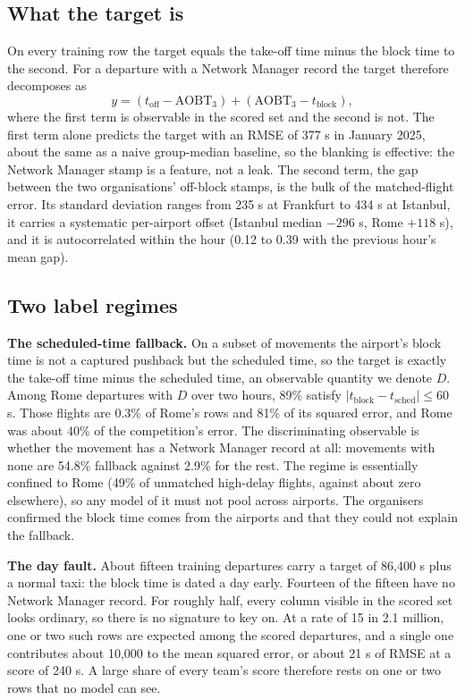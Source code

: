 \documentclass[
  manuscript=article,
  layout=preprint,
  year=2027,
  volume=x,
]{extra/joas}
\begin{document}
\subsection{What the target is}

On every training row the target equals the take-off time minus the block time to the second. For a departure with a Network Manager record the target therefore decomposes as
\begin{equation} \label{eq:decomp}
y = (t_{\mathrm{off}} - \mathrm{AOBT}_3) + (\mathrm{AOBT}_3 - t_{\mathrm{block}}),
\end{equation}
where the first term is observable in the scored set and the second is not. The first term alone predicts the target with an RMSE of 377 s in January 2025, about the same as a naive group-median baseline, so the blanking is effective: the Network Manager stamp is a feature, not a leak. The second term, the gap between the two organisations' off-block stamps, is the bulk of the matched-flight error. Its standard deviation ranges from 235 s at Frankfurt to 434 s at Istanbul, it carries a systematic per-airport offset (Istanbul median $-296$ s, Rome $+118$ s), and it is autocorrelated within the hour (0.12 to 0.39 with the previous hour's mean gap).

\subsection{Two label regimes}

\textbf{The scheduled-time fallback.} On a subset of movements the airport's block time is not a captured pushback but the scheduled time, so the target is exactly the take-off time minus the scheduled time, an observable quantity we denote $D$. Among Rome departures with $D$ over two hours, 89\% satisfy $|t_{\mathrm{block}} - t_{\mathrm{sched}}| \le 60$ s. Those flights are 0.3\% of Rome's rows and 81\% of its squared error, and Rome was about 40\% of the competition's error. The discriminating observable is whether the movement has a Network Manager record at all: movements with none are 54.8\% fallback against 2.9\% for the rest. The regime is essentially confined to Rome (49\% of unmatched high-delay flights, against about zero elsewhere), so any model of it must not pool across airports. The organisers confirmed the block time comes from the airports and that they could not explain the fallback.

\textbf{The day fault.} About fifteen training departures carry a target of 86,400 s plus a normal taxi: the block time is dated a day early. Fourteen of the fifteen have no Network Manager record. For roughly half, every column visible in the scored set looks ordinary, so there is no signature to key on. At a rate of 15 in 2.1 million, one or two such rows are expected among the scored departures, and a single one contributes about 10,000 to the mean squared error, or about 21 s of RMSE at a score of 240 s. A large share of every team's score therefore rests on one or two rows that no model can see.
\end{document}
